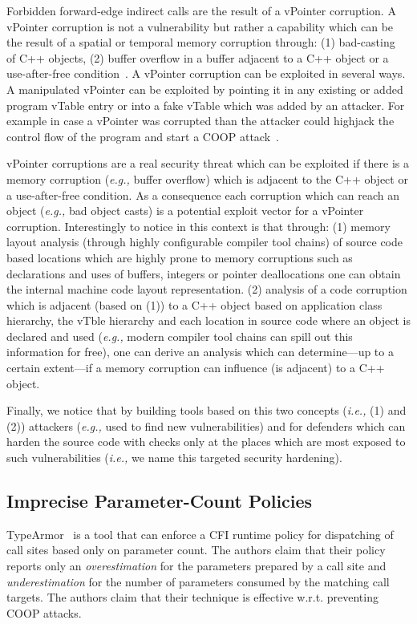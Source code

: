 Forbidden forward-edge indirect calls are the result of a vPointer corruption.
A vPointer corruption is not a vulnerability but rather a capability which 
can be the result of a spatial or temporal memory corruption through: 
(1) bad-casting~\cite{byoungyoung:typecasting} of C++ objects, 
(2) buffer overflow in a buffer adjacent to a C++ object or a use-after-free condition~\cite{schuster:coop}.
A vPointer corruption can be exploited in several ways. A manipulated vPointer
can be exploited by pointing it in any existing or added program vTable entry 
or into a fake vTable which was added by an attacker. For example in case a vPointer
was corrupted than the attacker could highjack the control flow of the program 
and start a COOP attack~\cite{schuster:coop}.

vPointer corruptions are a real security threat which can be exploited if there 
is a memory corruption (\textit{e.g.,} buffer overflow) which is adjacent to
the C++ object or a use-after-free condition. As a consequence each corruption 
which can reach an object (\textit{e.g.,} bad object casts) is a potential exploit vector 
for a vPointer corruption. Interestingly to notice in this context is that through:
(1) memory layout analysis (through highly configurable compiler tool chains) of 
source code based locations which are highly prone to
memory corruptions such as declarations and uses of buffers, integers or pointer 
deallocations one can obtain the internal machine code layout representation.
(2) analysis of a code corruption which is adjacent (based on (1)) to a C++ object based on
application class hierarchy, the vTble hierarchy and each location in source code where an object
is declared and used (\textit{e.g.,} modern compiler tool chains can spill out this information for free), 
one can derive an analysis which can determine---up to a certain extent---if a memory corruption 
can influence (is adjacent) to a C++ object.

Finally, we notice that by building tools based on this two concepts (\textit{i.e.,} (1) and (2))
attackers (\textit{e.g.,} used to find new vulnerabilities) and for defenders which can 
harden the source code with checks only at the places which are most exposed 
to such vulnerabilities (\textit{i.e.,} we name this targeted security hardening).

\subsection{Imprecise Parameter-Count Policies}
\label{Too Permissive Parameter-Based Policies}
TypeArmor~\cite{veen:typearmor} is a tool that can enforce a CFI runtime policy for dispatching of call sites based only on
parameter count. The authors claim that their policy reports only an \textit{overestimation} for the parameters prepared by a call site
and \textit{underestimation} for the number of parameters consumed by the matching call targets. The authors claim that their technique is 
effective w.r.t. preventing COOP attacks. 

